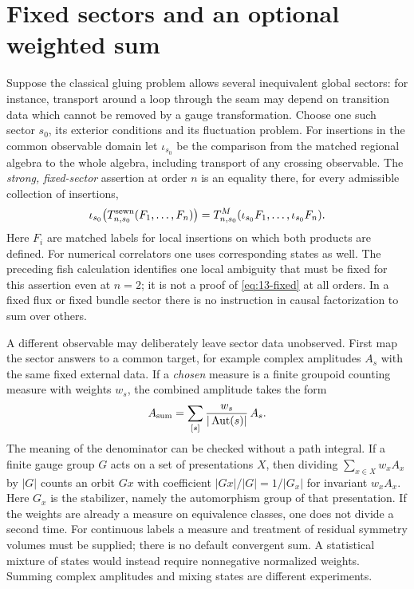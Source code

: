 \section{Fixed sectors and an optional weighted sum}
Suppose the classical gluing problem allows several inequivalent global
sectors: for instance, transport around a loop through the seam may depend
on transition data which cannot be removed by a gauge transformation.
Choose one such sector $s_0$, its exterior conditions and its fluctuation
problem. For insertions in the common observable domain let $\iota_{s_0}$
be the comparison from the matched regional algebra to the whole algebra,
including transport of any crossing observable. The \emph{strong,
fixed-sector} assertion at order $n$ is an equality there, for every
admissible collection of insertions,
\begin{equation}
 \iota_{s_0}\!\left(T^{\rm sewn}_{n,s_0}(F_1,\ldots,F_n)\right)
 =T^M_{n,s_0}(\iota_{s_0}F_1,\ldots,\iota_{s_0}F_n).
 \label{eq:13-fixed}
\end{equation}
Here $F_i$ are matched labels for local insertions on which both products
are defined. For numerical correlators one uses corresponding states as
well. The preceding fish calculation identifies one local ambiguity that
must be fixed for this assertion even at $n=2$; it is not a proof of
\eqref{eq:13-fixed} at all orders. In a fixed flux or fixed bundle sector
there is no instruction in causal factorization to sum over others.

A different observable may deliberately leave sector data unobserved.
First map the sector answers to a common target, for example complex
amplitudes $A_s$ with the same fixed external data. If a \emph{chosen}
measure is a finite groupoid counting measure with weights $w_s$, the
combined amplitude takes the form
\[
 A_{\rm sum}=\sum_{[s]}\frac{w_s}{|\operatorname{Aut}(s)|}\,A_s .
\]
The meaning of the denominator can be checked without a path integral. If
a finite gauge group $G$ acts on a set of presentations $X$, then dividing
$\sum_{x\in X}w_x A_x$ by $|G|$ counts an orbit $Gx$ with coefficient
$|Gx|/|G|=1/|G_x|$ for invariant $w_x A_x$. Here $G_x$ is the stabilizer,
namely the automorphism group of that presentation. If the weights are
already a measure on equivalence classes, one does not divide a second
time. For continuous labels a measure and treatment of residual symmetry
volumes must be supplied; there is no default convergent sum. A statistical
mixture of states would instead require nonnegative normalized weights.
Summing complex amplitudes and mixing states are different experiments.

